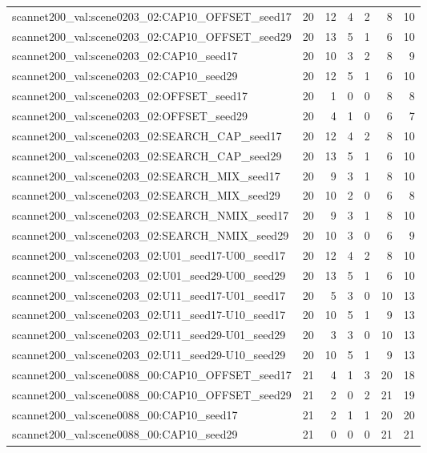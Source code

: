 \begin{table}[t]
\begin{tabular}{lrrrrrr}
scannet200\_val:scene0203\_02:CAP10\_OFFSET\_seed17 & 20 & 12 & 4 & 2 & 8 & 10 \\
scannet200\_val:scene0203\_02:CAP10\_OFFSET\_seed29 & 20 & 13 & 5 & 1 & 6 & 10 \\
scannet200\_val:scene0203\_02:CAP10\_seed17 & 20 & 10 & 3 & 2 & 8 & 9 \\
scannet200\_val:scene0203\_02:CAP10\_seed29 & 20 & 12 & 5 & 1 & 6 & 10 \\
scannet200\_val:scene0203\_02:OFFSET\_seed17 & 20 & 1 & 0 & 0 & 8 & 8 \\
scannet200\_val:scene0203\_02:OFFSET\_seed29 & 20 & 4 & 1 & 0 & 6 & 7 \\
scannet200\_val:scene0203\_02:SEARCH\_CAP\_seed17 & 20 & 12 & 4 & 2 & 8 & 10 \\
scannet200\_val:scene0203\_02:SEARCH\_CAP\_seed29 & 20 & 13 & 5 & 1 & 6 & 10 \\
scannet200\_val:scene0203\_02:SEARCH\_MIX\_seed17 & 20 & 9 & 3 & 1 & 8 & 10 \\
scannet200\_val:scene0203\_02:SEARCH\_MIX\_seed29 & 20 & 10 & 2 & 0 & 6 & 8 \\
scannet200\_val:scene0203\_02:SEARCH\_NMIX\_seed17 & 20 & 9 & 3 & 1 & 8 & 10 \\
scannet200\_val:scene0203\_02:SEARCH\_NMIX\_seed29 & 20 & 10 & 3 & 0 & 6 & 9 \\
scannet200\_val:scene0203\_02:U01\_seed17-U00\_seed17 & 20 & 12 & 4 & 2 & 8 & 10 \\
scannet200\_val:scene0203\_02:U01\_seed29-U00\_seed29 & 20 & 13 & 5 & 1 & 6 & 10 \\
scannet200\_val:scene0203\_02:U11\_seed17-U01\_seed17 & 20 & 5 & 3 & 0 & 10 & 13 \\
scannet200\_val:scene0203\_02:U11\_seed17-U10\_seed17 & 20 & 10 & 5 & 1 & 9 & 13 \\
scannet200\_val:scene0203\_02:U11\_seed29-U01\_seed29 & 20 & 3 & 3 & 0 & 10 & 13 \\
scannet200\_val:scene0203\_02:U11\_seed29-U10\_seed29 & 20 & 10 & 5 & 1 & 9 & 13 \\
scannet200\_val:scene0088\_00:CAP10\_OFFSET\_seed17 & 21 & 4 & 1 & 3 & 20 & 18 \\
scannet200\_val:scene0088\_00:CAP10\_OFFSET\_seed29 & 21 & 2 & 0 & 2 & 21 & 19 \\
scannet200\_val:scene0088\_00:CAP10\_seed17 & 21 & 2 & 1 & 1 & 20 & 20 \\
scannet200\_val:scene0088\_00:CAP10\_seed29 & 21 & 0 & 0 & 0 & 21 & 21 \\

\end{tabular}
\end{table}
